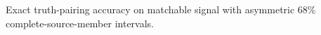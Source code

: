 Exact truth-pairing accuracy on matchable signal with asymmetric 68\% complete-source-member intervals.
